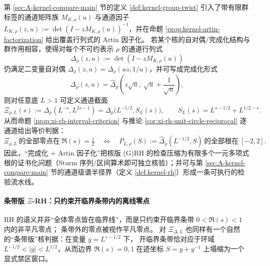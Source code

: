 \begin{remark}\label{rem:xi-artin-channel-pipeline}
第 \ref{sec:A-kernel-compare-main} 节的定义 \ref{def:kernel-group-twist} 引入了带有限群标签的通道矩阵族 \(M_{K,\rho}(u)\) 与通道因子
\(
L_{K,\rho}(z,u):=\det(I-zM_{K,\rho}(u))^{-1}
\)，并在命题 \ref{prop:kernel-artin-factorization} 给出覆盖行列式的 Artin 因子化。
若某个核的自对偶/完成化结构与群作用相容，使得对每个不可约表示 \(\rho\) 的通道行列式
\[
\Delta_\rho(z,u):=\det(I-zM_{K,\rho}(u))
\]
仍满足二变量自对偶 \(\Delta_\rho(z,u)=\Delta_\rho(uz,1/u)\)，并可写成完成化形式
\[
\Delta_\rho(z,u)=\widehat\Delta_\rho\!\left(z\sqrt{u},\ \sqrt{u}+\frac{1}{\sqrt{u}}\right),
\]
则对任意底 \(L>1\) 可定义通道截面
\[
\Xi_{\rho,L}(s):=\Delta_\rho(L^{-s},L^{2s-1})
=\widehat\Delta_\rho\!\bigl(L^{-1/2},S_L(s)\bigr),
\qquad S_L(s)=L^{s-1/2}+L^{1/2-s}.
\]
从而命题 \ref{prop:xi-rh-interval-criterion} 与推论 \ref{cor:xi-rh-unit-circle-reciprocal} 逐通道给出等价判据：
\[
\Xi_{\rho,L}\ \text{的全部零点在}\ \Re(s)=\tfrac12
\quad\Longleftrightarrow\quad
P_{L,\rho}(S):=\widehat\Delta_\rho(L^{-1/2},S)\ \text{的全部根在}\ [-2,2].
\]
因此，“完成化 + Artin 因子化”把核版 (G)RH 的检查压缩为有限多个一元多项式根的证书化问题（Sturm 序列/区间算术即可独立核验）；并可与第 \ref{sec:A-kernel-compare-main} 节的通道级谱半径界（定义 \ref{def:kernel-rh}）形成一条可执行的检验流水线。
\end{remark}

\paragraph{条带版 \texorpdfstring{$\Xi$}{Xi}-RH：只约束开临界条带内的离线零点}
RH 的语义并非“全体零点皆在临界线”，而是只约束开临界条带 \(0<\Re(s)<1\) 内的非平凡零点；
条带外的零点被视作平凡零点。
对 \(\Xi_{\Delta,L}\) 也同样有一个自然的“条带版”核判据：在变量 \(y=L^{s-1/2}\) 下，
开临界条带恰对应于环域 \(L^{-1/2}<|y|<L^{1/2}\)，从而边界 \(\Re(s)=0,1\) 在迹坐标 \(S=y+y^{-1}\) 上塌缩为一个显式禁区窗口。

